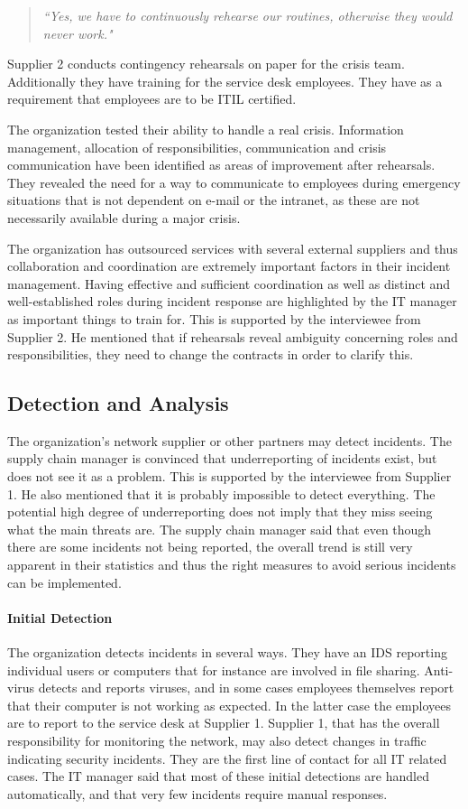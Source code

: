 \documentclass[b5paper, twoside, openright, 11pt]{report}
\begin{document}
\begin{quote}
\textit{``Yes, we have to continuously rehearse our routines, otherwise they would never work."}
\end{quote}

Supplier 2 conducts contingency rehearsals on paper for the crisis team. Additionally they have training for the service desk employees. They have as a requirement that employees are to be \ac{ITIL} certified.

The organization tested their ability to handle a real crisis. Information management, allocation of responsibilities, communication and crisis communication have been identified as areas of improvement after rehearsals. They revealed the need for a way to communicate to employees during emergency situations that is not dependent on e-mail or the intranet, as these are not necessarily available during a major crisis.

The organization has outsourced services with several external suppliers and thus collaboration and coordination are extremely important factors in their incident management. Having effective and sufficient coordination as well as distinct and well-established roles during incident response are highlighted by the IT manager as important things to train for. This is supported by the interviewee from Supplier 2. He mentioned that if rehearsals reveal ambiguity concerning roles and responsibilities, they need to change the contracts in order to clarify this.

\subsection{Detection and Analysis}
The organization's network supplier or other partners may detect incidents. The supply chain manager is convinced that underreporting of incidents exist, but does not see it as a problem. This is supported by the interviewee from Supplier 1. He also mentioned that it is probably impossible to detect everything. The potential high degree of underreporting does not imply that they miss seeing what the main threats are. The supply chain manager said that even though there are some incidents not being reported, the overall trend is still very apparent in their statistics and thus the right measures to avoid serious incidents can be implemented. 

\paragraph{Initial Detection}
The organization detects incidents in several ways. They have an \ac{IDS} reporting individual users or computers that for instance are involved in file sharing. Anti-virus detects and reports viruses, and in some cases employees themselves report that their computer is not working as expected. In the latter case the employees are to report to the service desk at Supplier 1. Supplier 1, that has the overall responsibility for monitoring the network, may also detect changes in traffic indicating security incidents. They are the first line of contact for all IT related cases. The IT manager said that most of these initial detections are handled automatically, and that very few incidents require manual responses. 
\end{document}
